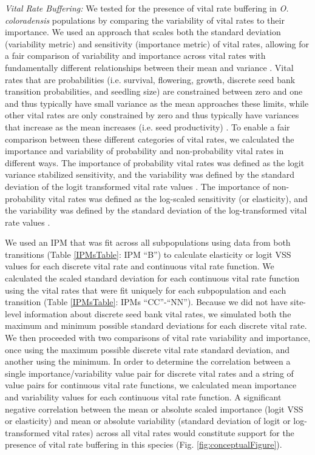 \documentclass[12pt, letterpaper]{article}
\begin{document}
\textit{Vital Rate Buffering:} We tested for the presence of vital rate buffering in \textit{O. coloradensis} populations by comparing the variability of vital rates to their importance. We used an approach that scales both the standard deviation (variability metric) and sensitivity (importance metric) of vital rates, allowing for a fair comparison of variability and importance across vital rates with fundamentally different relationships between their mean and variance \cite{McDonald2017DivergentEnvironments}. Vital rates that are probabilities (i.e. survival, flowering, growth, discrete seed bank transition probabilities, and seedling size) are constrained between zero and one and thus typically have small variance as the mean approaches these limits, while other vital rates are only constrained by zero and thus typically have variances that increase as the mean increases (i.e. seed productivity) \cite{Gaillard2003-ch}. To enable a fair comparison between these different categories of vital rates, we calculated the importance and variability of probability and non-probability vital rates in different ways. The importance of probability vital rates was defined as the logit variance stabilized sensitivity, and the variability was defined by the standard deviation of the logit transformed vital rate values \cite{McDonald2017DivergentEnvironments, William_A_Link_Paul_F_Doherty_Fr2002-cb}. The importance of non-probability vital rates was defined as the log-scaled sensitivity (or elasticity), and the variability was defined by the standard deviation of the log-transformed vital rate values \cite{McDonald2017DivergentEnvironments, Morris2002QuantitativeAnalysis}.

We used an IPM that was fit across all subpopulations using data from both transitions (Table \ref{IPMsTable}: IPM “B”) to calculate elasticity or logit VSS values for each discrete vital rate and continuous vital rate function. 
We calculated the scaled standard deviation for each continuous vital rate function using the vital rates that were fit uniquely for each subpopulation and each transition (Table \ref{IPMsTable}: IPMs “CC”-“NN”). Because we did not have site-level information about discrete seed bank vital rates, we simulated both the maximum and minimum possible standard deviations for each discrete vital rate. We then proceeded with two comparisons of vital rate variability and importance, once using the maximum possible discrete vital rate standard deviation, and another using the minimum. In order to determine the correlation between a single importance/variability value pair for discrete vital rates and a string of value pairs for continuous vital rate functions, we calculated mean importance and variability values for each continuous vital rate function. A significant negative correlation between the mean or absolute scaled importance (logit VSS or elasticity) and mean or absolute variability (standard deviation of logit or log-transformed vital rates) across all vital rates would constitute support for the presence of vital rate buffering in this species
(Fig. \ref{fig:conceptualFigure}).  
\end{document}
